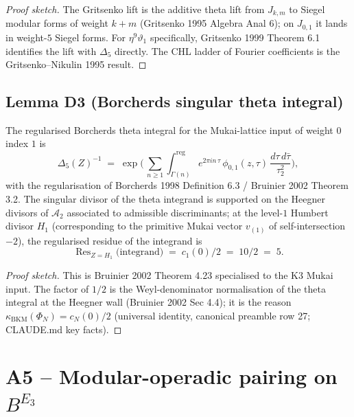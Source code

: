 \begin{proof}[Proof sketch]
The Gritsenko lift is the additive theta lift from $J_{k, m}$ to
Siegel modular forms of weight $k + m$ (Gritsenko 1995 Algebra
Anal 6); on $J_{0, 1}$ it lands in weight-$5$ Siegel forms.  For
$\eta^{9} \vartheta_{1}$ specifically, Gritsenko 1999 Theorem 6.1
identifies the lift with $\Delta_5$ directly.  The CHL ladder
of Fourier coefficients is the Gritsenko--Nikulin 1995 result.
\end{proof}

\subsection*{Lemma D3 (Borcherds singular theta integral)}

\begin{lemma}
\label{lem:bl6-borcherds-theta-integral}
The regularised Borcherds theta integral for the Mukai-lattice
input of weight $0$ index $1$ is
\[
   \Delta_5(Z)^{-1}
     \;=\;
   \exp\!\Biggl(\,
     \sum_{n \geq 1} \int^{\mathrm{reg}}_{\Gamma(n)}
       e^{2 \pi i n\,\tau}\, \phi_{0, 1}(z, \tau)\,
       \frac{d\tau\, d\bar\tau}{\tau_{2}^{2}}
   \Biggr),
\]
with the regularisation of Borcherds 1998 Definition 6.3 /
Bruinier 2002 Theorem 3.2.  The singular divisor of the theta
integrand is supported on the Heegner divisors of $\mathcal A_{2}$
associated to admissible discriminants; at the level-$1$ Humbert
divisor $H_{1}$ (corresponding to the primitive Mukai vector
$v_{(1)}$ of self-intersection $-2$), the regularised residue of
the integrand is
\[
   \mathop{\mathrm{Res}}_{Z = H_{1}}
     \bigl(\text{integrand}\bigr)
     \;=\;
   c_1(0) / 2 \;=\; 10 / 2 \;=\; 5.
\]
\end{lemma}

\begin{proof}[Proof sketch]
This is Bruinier 2002 Theorem 4.23 specialised to the K3 Mukai
input.  The factor of $1/2$ is the Weyl-denominator normalisation
of the theta integral at the Heegner wall (Bruinier 2002 Sec 4.4);
it is the reason $\kappa_{\mathrm{BKM}}(\Phi_{N}) = c_{N}(0)/2$
(universal identity, canonical preamble row 27; CLAUDE.md key
facts).
\end{proof}

\section*{A5 -- Modular-operadic pairing on $B^{E_3}$}

